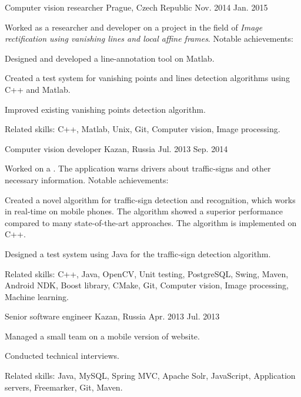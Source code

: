 \begin{cventries}
  \cventry
    {Computer vision researcher} %
    {} %
    {Prague, Czech Republic} %
    {Nov. 2014 \textemdash{} Jan. 2015} %
    {
	Worked as a researcher and developer on a project in the field of \textit{Image rectification using vanishing lines and local affine frames}. Notable achievements:
      \begin{cvitems}
      \item{Designed and developed a line-annotation tool on Matlab.}
      \item{Created a test system for vanishing points and lines detection algorithms using C++ and Matlab.}
      \item{Improved existing vanishing points detection algorithm.}
      \end{cvitems}
      Related skills: C++, Matlab, Unix, Git, Computer vision, Image processing.
    }
    
  \cventry
    {Computer vision developer} %
    {} %
    {Kazan, Russia} %
    {Jul. 2013 \textemdash{} Sep. 2014} %
    {
    Worked on a . The application warns drivers about traffic-signs and other necessary information. Notable achievements:
      \begin{cvitems}
      \item{Created a novel algorithm for traffic-sign detection and recognition, which works in real-time on mobile phones. The algorithm showed a superior performance compared to many state-of-the-art approaches. The algorithm is implemented on C++.}
      \item{Designed a test system using Java for the traffic-sign detection algorithm.}
      \end{cvitems}
      Related skills: C++, Java, OpenCV, Unit testing, PostgreSQL, Swing, Maven, Android NDK, Boost library, CMake, Git, Computer vision, Image processing, Machine learning.
    }
    
  \cventry
    {Senior software engineer} %
    {} %
    {Kazan, Russia} %
    {Apr. 2013 \textemdash{} Jul. 2013} %
    {
      \begin{cvitems_up}
      \item{Managed a small team on a mobile version of  website.}
      \item{Conducted technical interviews.}
      \end{cvitems_up}
      Related skills: Java, MySQL, Spring MVC, Apache Solr, JavaScript, Application servers, Freemarker, Git, Maven.
    }


\end{cventries}
